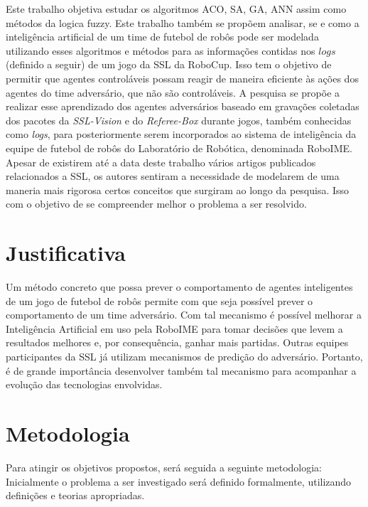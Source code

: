 Este trabalho objetiva estudar os algoritmos ACO, SA, GA, ANN assim como métodos
da logica fuzzy. Este trabalho também se propõem analisar, se e como a inteligência
artificial de um time de futebol de robôs pode ser modelada utilizando esses
algoritmos e métodos para as informações contidas nos $logs$ (definido a seguir)
de um jogo da SSL da RoboCup. Isso tem o objetivo de permitir que agentes controláveis
possam reagir de maneira eficiente às ações dos agentes do time adversário, que
não são controláveis. A pesquisa se propõe a realizar esse aprendizado dos
agentes adversários baseado em gravações coletadas dos pacotes da
\textit{SSL-Vision} e do \textit{Referee-Box} durante jogos, também conhecidas
como \textit{logs}, para posteriormente serem incorporados ao sistema de inteligência da
equipe de futebol de robôs do Laboratório de Robótica, denominada RoboIME. Apesar
de existirem até a data deste trabalho vários artigos publicados relacionados a
SSL, os autores sentiram a necessidade de modelarem de uma maneria mais rigorosa
certos conceitos que surgiram ao longo da pesquisa. Isso com o objetivo de se
compreender melhor o problema a ser resolvido.

\section{Justificativa}%

Um método concreto que possa prever o comportamento de agentes inteligentes de um jogo de
futebol de robôs permite com que seja possível prever o comportamento de um time adversário.
Com tal mecanismo é possível melhorar a Inteligência Artificial em uso pela RoboIME
para tomar decisões que levem a resultados melhores e, por consequência, ganhar mais partidas.
Outras equipes participantes da SSL já utilizam mecanismos de predição do adversário.
Portanto, é de grande importância desenvolver também tal mecanismo para acompanhar a evolução
das tecnologias envolvidas.

\section{Metodologia}

Para atingir os objetivos propostos, será seguida a seguinte metodologia:
Inicialmente o problema a ser investigado será definido formalmente,
utilizando definições e teorias apropriadas.

